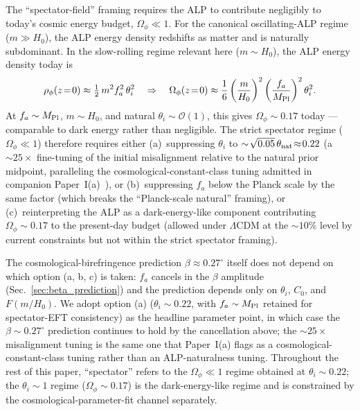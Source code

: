 \documentclass[a4paper,11pt]{article}
\begin{document}
The ``spectator-field'' framing requires the ALP to contribute negligibly to today's cosmic energy budget, $\Omega_\phi \ll 1$. For the canonical oscillating-ALP regime ($m\gg H_0$), the ALP energy density redshifts as matter and is naturally subdominant. In the slow-rolling regime relevant here ($m\sim H_0$), the ALP energy density today is
\begin{equation}
\rho_\phi(z\!=\!0) \approx \tfrac{1}{2}\,m^2 f_a^2\,\theta_i^2
\quad\Rightarrow\quad
\Omega_\phi(z\!=\!0) \approx \frac{1}{6}\left(\frac{m}{H_0}\right)^2
\left(\frac{f_a}{M_{\rm Pl}}\right)^2 \theta_i^2.
\end{equation}
At $f_a\sim M_{\rm Pl}$, $m\sim H_0$, and natural $\theta_i\sim \mathcal{O}(1)$, this gives $\Omega_\phi\!\sim\!0.17$ today --- comparable to dark energy rather than negligible. The strict spectator regime ($\Omega_\phi \ll 1$) therefore requires either (a)~suppressing $\theta_i$ to $\sim\!\sqrt{0.05}\,\theta_{\rm nat}\!\approx\!0.22$ (a $\sim\!25\!\times$ fine-tuning of the initial misalignment relative to the natural prior midpoint, paralleling the cosmological-constant-class tuning admitted in companion Paper~I(a)~\citep{Golden2026P1a}), or (b)~suppressing $f_a$ below the Planck scale by the same factor (which breaks the ``Planck-scale natural'' framing), or (c)~reinterpreting the ALP as a dark-energy-like component contributing $\Omega_\phi\!\sim\!0.17$ to the present-day budget (allowed under $\Lambda$CDM at the $\sim\!10\%$ level by current constraints but not within the strict spectator framing).

The cosmological-birefringence prediction $\beta\approx 0.27^\circ$ itself does not depend on which option (a, b, c) is taken: $f_a$ cancels in the $\beta$ amplitude (Sec.~\ref{sec:beta_prediction}) and the prediction depends only on $\theta_i$, $C_0$, and $F(m/H_0)$. We adopt option (a) ($\theta_i\sim 0.22$, with $f_a\sim M_{\rm Pl}$ retained for spectator-EFT consistency) as the headline parameter point, in which case the $\beta\sim 0.27^\circ$ prediction continues to hold by the cancellation above; the $\sim\!25\!\times$ misalignment tuning is the same one that Paper~I(a) flags as a cosmological-constant-class tuning rather than an ALP-naturalness tuning. Throughout the rest of this paper, ``spectator'' refers to the $\Omega_\phi\!\ll\!1$ regime obtained at $\theta_i\!\sim\!0.22$; the $\theta_i\!\sim\!1$ regime ($\Omega_\phi\!\sim\!0.17$) is the dark-energy-like regime and is constrained by the cosmological-parameter-fit channel separately.
\end{document}
